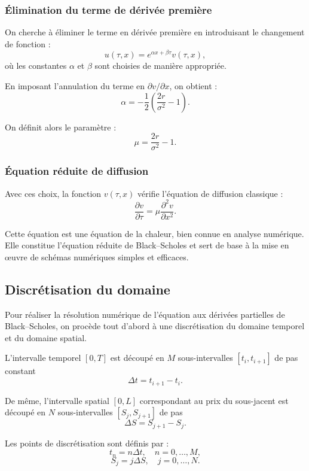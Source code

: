 \documentclass[12pt,a4paper]{article}
\begin{document}
\subsubsection*{Élimination du terme de dérivée première}

On cherche à éliminer le terme en dérivée première en introduisant le changement de
fonction :
\[
u(\tau,x) = e^{\alpha x + \beta \tau} v(\tau,x),
\]
où les constantes \( \alpha \) et \( \beta \) sont choisies de manière appropriée.

En imposant l’annulation du terme en \( \partial v / \partial x \), on obtient :
\[
\alpha = -\frac{1}{2} \left( \frac{2r}{\sigma^2} - 1 \right).
\]

On définit alors le paramètre :
\[
\mu = \frac{2r}{\sigma^2} - 1.
\]

\subsubsection*{Équation réduite de diffusion}

Avec ces choix, la fonction \(v(\tau,x)\) vérifie l’équation de diffusion classique :
\begin{equation}
\frac{\partial v}{\partial \tau}
=
\mu
\frac{\partial^2 v}{\partial x^2}.
\end{equation}

Cette équation est une équation de la chaleur, bien connue en analyse numérique.
Elle constitue l’équation réduite de Black--Scholes et sert de base à la mise en
œuvre de schémas numériques simples et efficaces.


\subsection{Discrétisation du domaine}

Pour réaliser la résolution numérique de l’équation aux dérivées partielles de
Black--Scholes, on procède tout d’abord à une discrétisation du domaine temporel et
du domaine spatial.

L’intervalle temporel $[0,T]$ est découpé en $M$ sous-intervalles
$[t_i,t_{i+1}]$ de pas constant
\[
\Delta t = t_{i+1} - t_i .
\]

De même, l’intervalle spatial $[0,L]$ correspondant au prix du sous-jacent est
découpé en $N$ sous-intervalles $[S_j,S_{j+1}]$ de pas
\[
\Delta S = S_{j+1} - S_j .
\]

Les points de discrétisation sont définis par :
\[
t_n = n\Delta t, \quad n = 0,\dots,M,
\]
\[
S_j = j\Delta S, \quad j = 0,\dots,N.
\]
\end{document}
